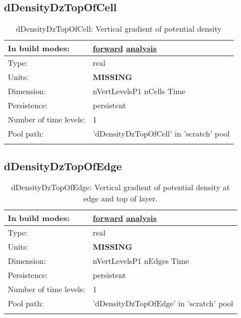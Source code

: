 \subsection[dDensityDzTopOfCell]{dDensityDzTopOfCell}
\label{subsec:var_sec_scratch_dDensityDzTopOfCell}
\begin{center}
\begin{longtable}{| p{2.0in} | p{4.0in} |}
        \hline 
        In build modes: & \hyperref[subsec:forward_var_tab_scratch]{forward} \hyperref[subsec:analysis_var_tab_scratch]{analysis} \\
        \hline 
        Type: & real \\
        \hline 
        Units: & {\bf \color{red} MISSING} \\
        \hline 
        Dimension: & nVertLevelsP1 nCells Time \\
        \hline 
        Persistence: & persistent \\
        \hline 
        Number of time levels: & 1 \\
        \hline 
            Pool path: & 'dDensityDzTopOfCell' in 'scratch' pool
 \\
		 \hline 
    \caption{dDensityDzTopOfCell: Vertical gradient of potential density}
\end{longtable}
\end{center}
\subsection[dDensityDzTopOfEdge]{dDensityDzTopOfEdge}
\label{subsec:var_sec_scratch_dDensityDzTopOfEdge}
\begin{center}
\begin{longtable}{| p{2.0in} | p{4.0in} |}
        \hline 
        In build modes: & \hyperref[subsec:forward_var_tab_scratch]{forward} \hyperref[subsec:analysis_var_tab_scratch]{analysis} \\
        \hline 
        Type: & real \\
        \hline 
        Units: & {\bf \color{red} MISSING} \\
        \hline 
        Dimension: & nVertLevelsP1 nEdges Time \\
        \hline 
        Persistence: & persistent \\
        \hline 
        Number of time levels: & 1 \\
        \hline 
            Pool path: & 'dDensityDzTopOfEdge' in 'scratch' pool
 \\
		 \hline 
    \caption{dDensityDzTopOfEdge: Vertical gradient of potential density at edge and top of layer.}
\end{longtable}
\end{center}

